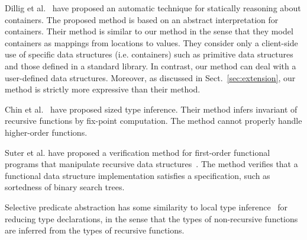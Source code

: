 Dillig et al.~\cite{Dillig2011} have proposed an automatic technique for 
statically reasoning about containers.  The proposed method is based on 
an abstract interpretation for containers.  Their method is similar to 
our method in the sense that they model containers as mappings from 
locations to values.  They consider only a client-side use of specific 
data structures (i.e. containers) such as primitive data structures and 
those defined in a standard library.  In contrast, our method can deal 
with a user-defined data structures.  Moreover, as discussed in 
Sect.~\ref{sec:extension}, our method is strictly more expressive than 
their method.

Chin et al.~\cite{Chin2003} have proposed sized type inference.  Their
method infers invariant of recursive functions by fix-point computation.
The method cannot properly handle higher-order functions.

Suter et al. have proposed a verification method for first-order 
functional programs that manipulate recursive data 
structures~\cite{Suter2010,Suter2011}.  The method verifies that a 
functional data structure implementation satisfies a specification, such 
as sortedness of binary search trees.

Selective predicate abstraction has some similarity to local type
inference~\cite{Pierce2000} for reducing type declarations, in the sense
that the types of non-recursive functions are inferred from the types of
recursive functions.
